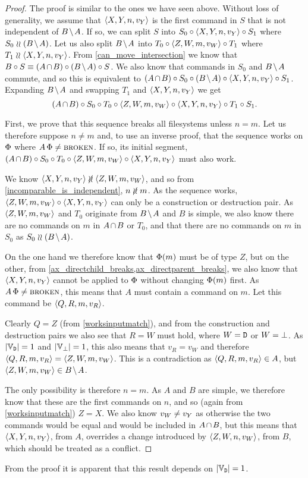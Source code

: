 \begin{proof}
The proof is similar to the ones we have seen above.
Without loss of generality, we assume that $\langle{X,Y,n,v_Y}\rangle$ is the first command in $S$
that is not independent of $\bmanp$.
If so, we can split $S$ into $S_0\circ\langle{X,Y,n,v_Y}\rangle\circ S_1$ where $S_0\indep\bma$.
Let us also split $\bmanp$ into $T_0\circ\langle{Z,W,m,v_W}\rangle\circ T_1$ where $T_1\mathrel{\wr\wr}\langle{X,Y,n,v_Y}\rangle$.
From \cref{can_move_intersection} we know that
$B\cc S \equiv \acb\cc\bma\cc S$.
We also know that commands in $S_0$ and $\bmanp$ commute, and so this is equivalent to
$\acb\cc S_0\cc\bma\cc\cxynv\cc S_1$.
Expanding $\bmanp$ and swapping $T_1$ and $\langle{X,Y,n,v_Y}\rangle$ we get
\[ (A\nobreak\hspace{-1pt plus 1pt}\nobreak\cap\nobreak\hspace{-1pt plus 1pt}\nobreak B)\circ S_0\circ T_0 \circ \langle{Z,W,m,v_W}\rangle \circ \langle{X,Y,n,v_Y}\rangle\circ T_1\circ S_1. \]

First, we prove that this sequence breaks all filesystems
unless $n=m$.
Let us therefore suppose $n\neq m$ and, to use an inverse proof,
that the sequence works on $\Phi$ where $A\,\Phi\neq\text{\normalfont\scshape{broken}}$.
If so, its initial segment, $(A\nobreak\hspace{-1pt plus 1pt}\nobreak\cap\nobreak\hspace{-1pt plus 1pt}\nobreak B)\circ S_0\circ T_0 \circ \langle{Z,W,m,v_W}\rangle \circ \langle{X,Y,n,v_Y}\rangle$ must also work.

We know $\cxynv\nindep\czwmv$, and so from \cref{incomparable_is_independent}, $n\nunrel m$.
As the sequence works, $\langle{Z,W,m,v_W}\rangle\circ\langle{X,Y,n,v_Y}\rangle$ can only be a construction or destruction pair.
As $\langle{Z,W,m,v_W}\rangle$ and $T_0$ originate from $\bmanp$ and $B$ is simple, we also know there are
no commands on $m$ in $\acbnp$ or $T_0$,
and that there are no commands on $m$ in $S_0$ as $S_0\indep\bma$.

On the one hand we therefore know that $\Phi(m)$ must be of type $Z$,
but on the other, from \cref{ax_directchild_breaks,ax_directparent_breaks},
we also know that $\langle{X,Y,n,v_Y}\rangle$ cannot be applied to $\Phi$ without
changing $\Phi(m)$ first.
As $A\,\Phi\neq\text{\normalfont\scshape{broken}}$, this means that $A$ must contain a command on $m$.
Let this command be $\langle{Q,R,m,v_R}\rangle$.

Clearly $Q=Z$ (from \cref{worksinputmatch}), and from the construction and destruction
pairs we also see that $R=W$ must hold, where $W=\mathtt{D}$ or $W=\bot$.
As $|\mathbb{V}_{\mathtt{D}}|=1$ and $|\mathbb{V}_{\bot}|=1$, this also means that $v_R=v_W$ and therefore
$\langle{Q,R,m,v_R}\rangle = \langle{Z,W,m,v_W}\rangle$.
This is a contradiction as $\langle{Q,R,m,v_R}\rangle\in A$, but $\czwmv\in\bmanp$.

The only possibility is therefore $n=m$.
As $A$ and $B$ are simple, we therefore know that these are the first commands on $n$,
and so (again from \cref{worksinputmatch}) $Z=X$.
We also know $v_W\neq v_Y$ as otherwise the two commands would be equal and
would be included in $\acbnp$,
but this means that $\langle{X,Y,n,v_Y}\rangle$, from $A$, overrides a change introduced 
by $\langle{Z,W,n,v_W}\rangle$, from $B$, which should be treated as a conflict.
\end{proof}

From the proof it is apparent that this result depends on $|\mathbb{V}_{\mathtt{D}}|=1$.

